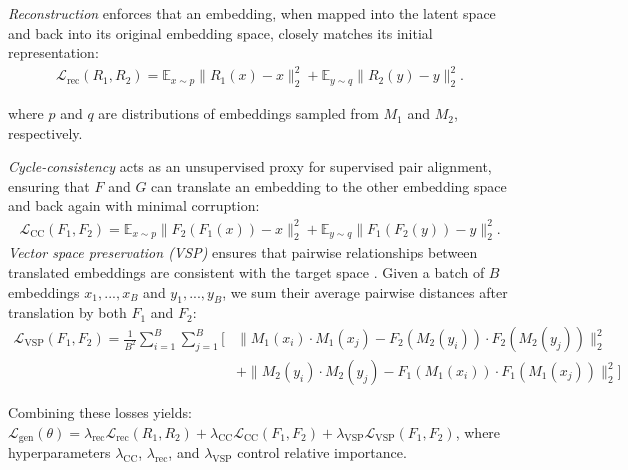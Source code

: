 \textit{Reconstruction} enforces that an embedding, when mapped into the latent space and back into its original embedding space, closely matches its initial representation:
\begin{align*}
    \mathcal{L}_{\text{rec}}(R_1,R_2) = \mathbb{E}_{x \sim p}\|R_1(x)-x\|_2^2 + \mathbb{E}_{y \sim q}\|R_2(y)-y\|_2^2.
\end{align*}

where $p$ and $q$ are distributions of embeddings sampled from $M_1$ and $M_2$, respectively.

\textit{Cycle-consistency} acts as an unsupervised proxy for supervised pair alignment, ensuring that $F$ and $G$ can translate an embedding to the other embedding space and back again with minimal corruption:
\begin{align*}
    \mathcal{L}_{\text{CC}}(F_1,F_2) = \mathbb{E}_{x \sim p}\|F_2(F_1(x))-x\|_2^2 + \mathbb{E}_{y \sim q}\|F_1(F_2(y))-y\|_2^2.
\end{align*}
\textit{Vector space preservation (VSP)} ensures that pairwise relationships between translated embeddings are consistent with the target space \citep{mrksic2016counterfittingwordvectorslinguistic, yoon2025embeddingconverter}. Given a batch of $B$ embeddings $x_1, ..., x_B$ and $y_1, ..., y_B$, we sum their average pairwise distances after translation by both $F_1$ and $F_2$:
\begin{align*}
    \mathcal{L}_{\text{VSP}}(F_1,F_2) = \frac{1}{B^2} \sum_{i=1}^{B} \sum_{j=1}^{B} \bigg[ & \|M_1(x_i) \cdot M_1(x_j) - F_2(M_2(y_i)) \cdot F_2(M_2(y_j))\|_2^2 \\
    & +  \|M_2(y_i) \cdot M_2(y_j) - F_1(M_1(x_i)) \cdot F_1(M_1(x_j))\|_2^2 \bigg]
\end{align*}

Combining these losses yields:
$\mathcal{L}_{\text{gen}}(\theta) = \lambda_{\text{rec}}\mathcal{L}_{\text{rec}}(R_1,R_2) + \lambda_{\text{CC}}\mathcal{L}_{\text{CC}}(F_1,F_2) + \lambda_{\text{VSP}}\mathcal{L}_{\text{VSP}}(F_1,F_2)$, where hyperparameters $\lambda_{\text{CC}}$, $\lambda_{\text{rec}}$, and $\lambda_{\text{VSP}}$ control relative importance.


